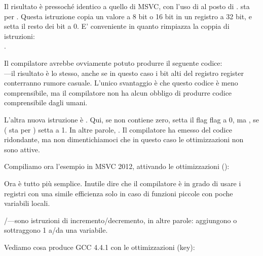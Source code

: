 \label{movzx}

Il risultato è pressoché identico a quello di MSVC, con l'uso di \MOVZX al posto di \MOVSX. 
\MOVZX sta per . 
Questa istruzione copia un valore a 8 bit o 16 bit in un registro a 32 bit, e setta il resto dei bit a 0.
E' conveniente in quanto rimpiazza la coppia di istruzioni:\\
.

Il compilatore avrebbe ovviamente potuto produrre il seguente codice: \\
---il risultato è lo stesso, anche se in questo caso 
i bit alti del registro \EAX register conterranno rumore casuale. 
L'unico svantaggio è che questo codice è meno comprensibile, ma il compilatore non ha alcun obbligo di produrre codice comprensibile dagli umani.


L'altra nuova istruzione è \SETNZ.
Qui, se \AL non contiene zero,  
setta il flag \ZF flag a 0, ma \SETNZ, se  ( sta per ) setta \AL a 1.
In altre parole, . 
Il compilatore ha emesso del codice ridondante, ma non dimentichiamoci che in questo caso le ottimizzazioni non sono attive.

\label{strlen_MSVC_Ox}

Compiliamo ora l'esempio in MSVC 2012, attivando le ottimizzazioni (\Ox):



Ora è tutto più semplice. Inutile dire che il compilatore è in grado di usare i registri con una simile efficienza solo
in caso di funzioni piccole con poche variabili locali.

\INC/\DEC---sono istruzioni di \gls{incremento}/\gls{decremento}, in altre parole: aggiungono o sottraggono 1 a/da una variabile.




Vediamo cosa produce GCC 4.4.1 con le ottimizzazioni (\Othree key):



